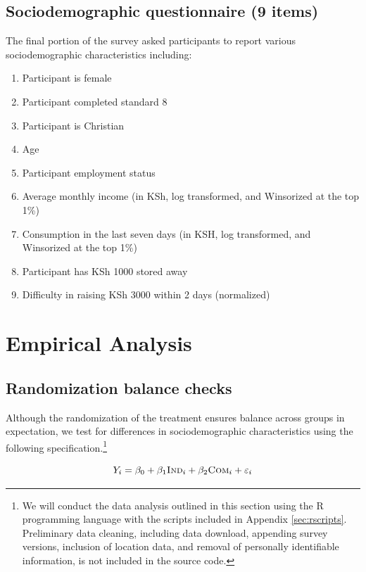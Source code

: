 \documentclass[11pt, a4paper]{article}\usepackage[]{graphicx}\usepackage[]{color}
\begin{document}
    \subsection{Sociodemographic questionnaire (9 items)}

        The final portion of the survey asked participants to report various sociodemographic characteristics including:

        \begin{enumerate}
        \itemsep0em
            \item Participant is female
            \item Participant completed standard 8
            \item Participant is Christian
            \item Age
            \item Participant employment status
            \item Average monthly income (in KSh, log transformed, and Winsorized at the top 1\%)
            \item Consumption in the last seven days (in KSH, log transformed, and Winsorized at the top 1\%)
            \item Participant has KSh 1000 stored away
            \item Difficulty in raising KSh 3000 within 2 days (normalized)
        \end{enumerate}

\section{Empirical Analysis}

    \subsection{Randomization balance checks}

        Although the randomization of the treatment ensures balance across groups in expectation, we test for differences in sociodemographic characteristics using the following specification.\footnote{We will conduct the data analysis outlined in this section using the R programming language with the scripts included in Appendix \ref{sec:rscripts}. Preliminary data cleaning, including data download, appending survey versions, inclusion of location data, and removal of personally identifiable information, is not included in the source code.}

        \begin{equation} \label{eq:balance}
        Y_{i} = \beta_{0} + \beta_{1}\text{\textsc{Ind}}_{i} + \beta_{2}\text{\textsc{Com}}_{i} + \varepsilon_{i}
        \end{equation}
\end{document}
